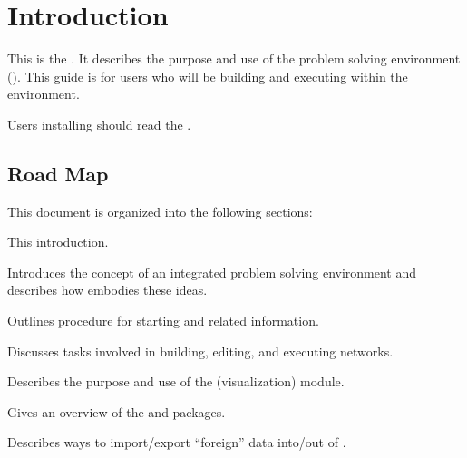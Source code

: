 %
%
%
%
%

%

\section{Introduction}
\label{sec:intro}


This is the \etitle{\srug}.  It describes the purpose and use of the
\sr{} problem solving environment (\pse).  This guide is for users who
will be building and executing  within the \sr{}
environment.

Users installing \sr{} should read the
.




\subsection{Road Map}
\label{sec:roadmap}

This document is organized into the following sections:

\begin{description}
   This introduction.
  
   Introduces the concept of
  an integrated problem solving environment and describes how \SR{}
  embodies these ideas.
  
   Outlines procedure
  for starting \sr{} and related information.

  Discusses tasks involved in building, editing, and executing
  networks.

  Describes the purpose and use of the \viewer{} (visualization) module.

   Gives an overview
  of the \sr{} and \biopse{} packages.
  
   Describes
  ways to import/export ``foreign'' data into/out of \SR{}.
\end{description}

